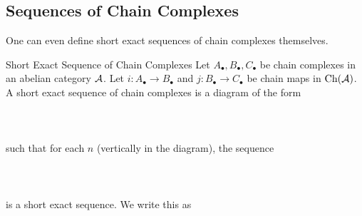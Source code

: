 \documentclass[a4paper]{article}
\begin{document}
\subsection{Sequences of Chain Complexes}
One can even define short exact sequences of chain complexes themselves. 

\begin{defn}{Short Exact Sequence of Chain Complexes}{} Let $A_\bullet,B_\bullet,C_\bullet$ be chain complexes in an abelian category $\mathcal{A}$. Let $i:A_\bullet\to B_\bullet$ and $j:B_\bullet\to C_\bullet$ be chain maps in $\text{Ch}(\mathcal{A})$. A short exact sequence of chain complexes is a diagram of the form \\~\\
\\~\\
such that for each $n$ (vertically in the diagram), the sequence \\~\\
\\~\\ is a short exact sequence. We write this as \\~\\
\end{defn}
\end{document}
